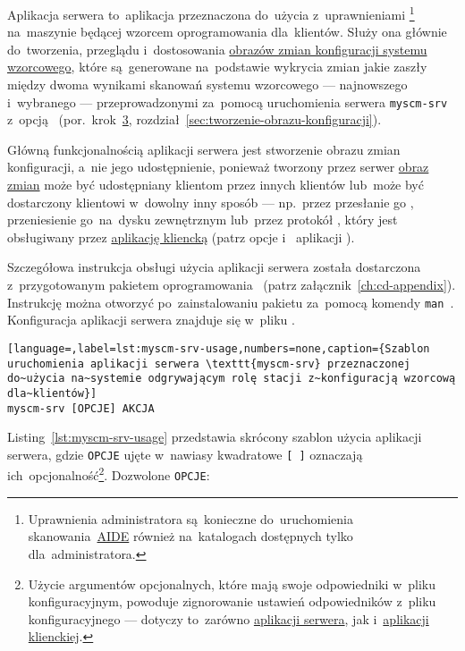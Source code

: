\documentclass[thesis]{subfiles}
\begin{document}
Aplikacja serwera to~aplikacja przeznaczona do~użycia z~uprawnieniami \superuser{}\footnote{Uprawnienia administratora są~konieczne do~uruchomienia skanowania~\hyperref[sec:aide]{AIDE} również na~katalogach dostępnych tylko dla~administratora.} na~maszynie będącej wzorcem oprogramowania dla~klientów. Służy ona głównie do~tworzenia, przeglądu i~dostosowania \hyperref[sec:obraz-zmian-konfiguracji]{obrazów zmian konfiguracji systemu wzorcowego}, które są~generowane na~podstawie wykrycia zmian jakie zaszły między dwoma wynikami skanowań systemu wzorcowego --- najnowszego i~wybranego --- przeprowadzonymi za~pomocą uruchomienia serwera \texttt{myscm-srv} z~opcją ~(por.~krok~\hyperlink{itm:stworzenie-obrazu-konfiguracji}{3}, rozdział~\ref{sec:tworzenie-obrazu-konfiguracji}).

Główną funkcjonalnością aplikacji serwera jest stworzenie obrazu zmian konfiguracji, a~nie jego udostępnienie, ponieważ tworzony przez serwer \hyperref[sec:obraz-zmian-konfiguracji]{obraz zmian} może być udostępniany klientom przez innych klientów lub~może być dostarczony klientowi w~dowolny inny sposób --- np.~przez przesłanie go , przeniesienie go~na~dysku zewnętrznym lub~przez protokół \sftp{}, który jest obsługiwany przez \hyperref[sec:cli-app]{aplikację kliencką}  (patrz opcje  i~ aplikacji \texttt{\cliappname{}}).

Szczegółowa instrukcja obsługi użycia aplikacji serwera została dostarczona z~przygotowanym pakietem oprogramowania \texttt{\srvappname{}}~(patrz załącznik~\ref{ch:cd-appendix}). Instrukcję można otworzyć po~zainstalowaniu pakietu \texttt{\srvappname{}} za~pomocą komendy \texttt{man~\srvappname{}}. Konfiguracja aplikacji serwera znajduje się w~pliku \myscmsrvconfig{}.

\begin{lstlisting}[language=,label=lst:myscm-srv-usage,numbers=none,caption={Szablon uruchomienia aplikacji serwera \texttt{myscm-srv} przeznaczonej do~użycia na~systemie odgrywającym rolę stacji z~konfiguracją wzorcową dla~klientów}]
myscm-srv [OPCJE] AKCJA
\end{lstlisting}

Listing~\ref{lst:myscm-srv-usage} przedstawia skrócony szablon użycia aplikacji serwera, gdzie \texttt{OPCJE} ujęte w~nawiasy kwadratowe \texttt{[~]} oznaczają ich~opcjonalność\footnote{Użycie argumentów opcjonalnych, które mają swoje odpowiedniki w~pliku konfiguracyjnym, powoduje zignorowanie ustawień odpowiedników z~pliku konfiguracyjnego --- dotyczy to~zarówno \hyperref[sec:srv-app]{aplikacji serwera}, jak i~\hyperref[sec:cli-app]{aplikacji klienckiej}.}. Dozwolone \texttt{OPCJE}:\mynobreakpar
\end{document}
